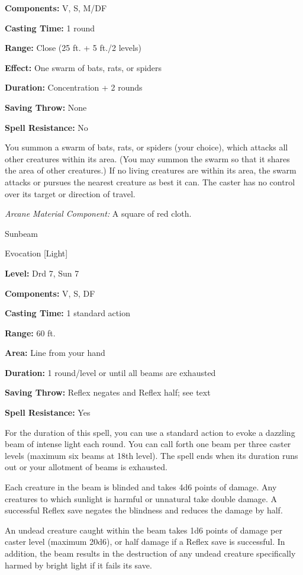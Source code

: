 \documentclass{article}
\begin{document}
\textbf{Components:} V, S, M/DF

\textbf{Casting Time:} 1 round

\textbf{Range:} Close (25 ft. + 5 ft./2 levels)

\textbf{Effect:} One swarm of bats, rats, or spiders

\textbf{Duration:} Concentration + 2 rounds

\textbf{Saving Throw:} None

\textbf{Spell Resistance:} No

You summon a swarm of bats, rats, or spiders (your choice), which attacks all other 
creatures within its area. (You may summon the swarm so that it shares the area 
of other creatures.) If no living creatures are within its area, the swarm attacks 
or pursues the nearest creature as best it can. The caster has no control over 
its target or direction of travel.

\textit{Arcane Material Component: }A square of red cloth.

\vspace{12pt}
Sunbeam

Evocation [Light]

\textbf{Level:} Drd 7, Sun 7

\textbf{Components:} V, S, DF

\textbf{Casting Time:} 1 standard action

\textbf{Range:} 60 ft.

\textbf{Area:} Line from your hand

\textbf{Duration:} 1 round/level or until all beams are exhausted

\textbf{Saving Throw:} Reflex negates and Reflex half; see text

\textbf{Spell Resistance:} Yes

For the duration of this spell, you can use a standard action to evoke a dazzling 
beam of intense light each round. You can call forth one beam per three caster 
levels (maximum six beams at 18th level). The spell ends when its duration runs 
out or your allotment of beams is exhausted.

Each creature in the beam is blinded and takes 4d6 points of damage. Any creatures 
to which sunlight is harmful or unnatural take double damage. A successful Reflex 
save negates the blindness and reduces the damage by half.

An undead creature caught within the beam takes 1d6 points of damage per caster 
level (maximum 20d6), or half damage if a Reflex save is successful. In addition, 
the beam results in the destruction of any undead creature specifically harmed 
by bright light if it fails its save.
\end{document}

